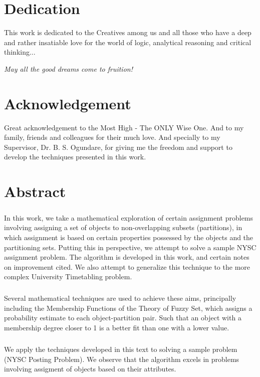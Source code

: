 \documentclass[a4paper,openany]{book}
\begin{document}
	\chapter[Dedication]{ \centering Dedication}
		This work is dedicated to the Creatives among us and all those who have a deep and rather insatiable love for the world of logic, analytical reasoning and critical thinking...
		\begin{center}
			\textit{May all the good dreams come to fruition!}
		\end{center}
	\chapter[Acknowledgement]{ \centering Acknowledgement}
		Great acknowledgement to the Most High - The ONLY Wise One. And to my family, friends and colleagues for their much love. And specially to my Supervisor, Dr. B. S. Ogundare, for giving me the freedom and support to develop the techniques presented in this work.
	\chapter[Abstract]{ \centering Abstract}
		\paragraph{}
		In this work, we take a mathematical exploration of certain assignment problems involving assigning a set of objects to non-overlapping subsets (partitions), in which assignment is based on certain properties possessed by the objects and the partitioning sets. Putting this in perspective, we attempt to solve a sample NYSC assignment problem. The algorithm is developed in this work, and certain notes on improvement cited. We also attempt to generalize this technique to the more complex University Timetabling problem.
		
		\paragraph{}
		Several mathematical techniques are used to achieve these aims, principally including the Membership Functions of the Theory of Fuzzy Set, which assigns a probability estimate to each object-partition pair. Such that an object with a membership degree closer to 1 is a better fit than one with a lower value.
		
		\paragraph{}
		We apply the techniques developed in this text to solving a sample problem (NYSC Posting Problem). We observe that the algorithm excels in problems involving assigment of objects based on their attributes.
		
\end{document}
